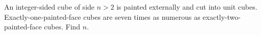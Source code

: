 An integer-sided cube of side $n>2$ is painted externally and cut into unit cubes. Exactly-one-painted-face cubes are seven times as numerous as exactly-two-painted-face cubes. Find $n$.

